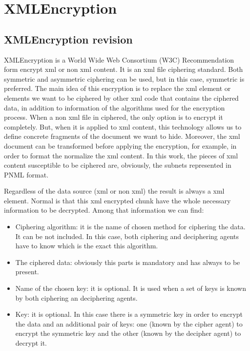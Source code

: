 \section{XMLEncryption}


\subsection{XMLEncryption revision}
XMLEncryption is a World Wide Web Consortium (W3C)
Recommendation form  encrypt xml or non xml content. It is an xml file ciphering standard. Both symmetric and asymmetric ciphering can be used, but in this case, symmetric is preferred.
The main idea of this encryption is to replace the xml element or elements
we want to be ciphered by other xml code that contains the ciphered data, in addition to information of the algorithms used for the encryption process. When a non xml file in ciphered, the only option is to encrypt it completely. But,  when it is applied to xml content, this technology allows us to define concrete fragments of the document we want to hide. Moreover, the xml document can be transformed before applying the encryption, for example, in order to format the normalize the xml content.
In this work, the pieces of xml content susceptible to be ciphered are, obviously,
the subnets represented in PNML format. 

Regardless of the data source (xml or non xml) the result is always a xml element. Normal is that this xml encrypted chunk have the whole necessary information to be decrypted. Among that information we can find:

\begin{itemize}
\item Ciphering algorithm: it is the name of chosen method for ciphering
the data. It can be not included. In this case, both ciphering and deciphering agents have to know which is the exact this algorithm.
\item The ciphered data: obviously this parts is mandatory and has always
to be present.
\item Name of the chosen key: it is optional. It is used when a set of keys is known by both ciphering an deciphering agents.
\item Key: it is optional. In this case there is a symmetric key in order
to encrypt the data and an additional pair of keys: one (known by the cipher
agent) to encrypt the symmetric key and the other (known by the decipher agent) to decrypt it. 
\end{itemize} 


